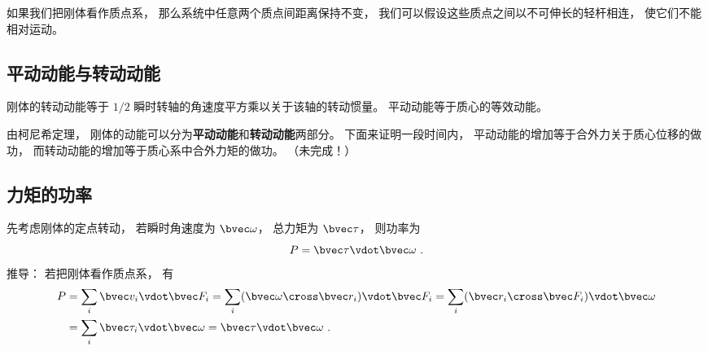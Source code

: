 
\begin{issues}
\issueDraft
\end{issues}


如果我们把刚体看作质点系， 那么系统中任意两个质点间距离保持不变， 我们可以假设这些质点之间以不可伸长的轻杆相连， 使它们不能相对运动。

\subsection{平动动能与转动动能}

刚体的转动动能等于 $1/2$ 瞬时转轴的角速度平方乘以关于该轴的转动惯量。 平动动能等于质心的等效动能。

由柯尼希定理， 刚体的动能可以分为\textbf{平动动能}和\textbf{转动动能}两部分。 下面来证明一段时间内， 平动动能的增加等于合外力关于质心位移的做功， 而转动动能的增加等于质心系中合外力矩的做功。
（未完成！）

\subsection{力矩的功率}
先考虑刚体的定点转动， 若瞬时角速度为 $\bvec \omega$， 总力矩为 $\bvec \tau$， 则功率为
\begin{equation}
P = \bvec \tau\vdot \bvec \omega~.
\end{equation}
推导： 若把刚体看作质点系， 有
\begin{equation}
\begin{aligned}
P &= \sum_i \bvec v_i \vdot \bvec F_i
= \sum_i (\bvec \omega \cross \bvec r_i) \vdot \bvec F_i
= \sum_i (\bvec r_i\cross\bvec F_i)\vdot \bvec \omega\\
&= \sum_i \bvec \tau_i \vdot \bvec \omega = \bvec \tau\vdot \bvec \omega~.
\end{aligned}
\end{equation}



